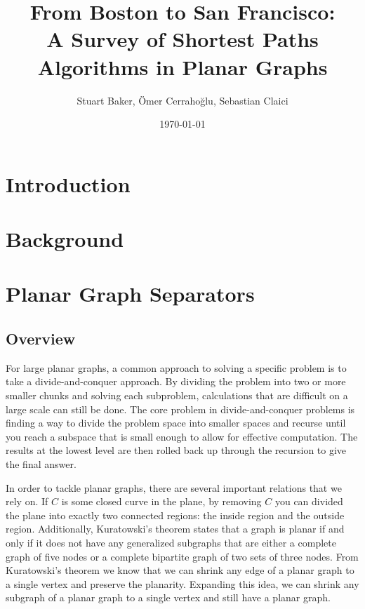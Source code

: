 \documentclass[12pt]{article}
\title{From Boston to San Francisco:\\ A Survey of Shortest Paths Algorithms in Planar Graphs}
\author{Stuart Baker, \"{O}mer Cerraho\u{g}lu, Sebastian Claici}
\date{\today}
\begin{document}
\maketitle

\begin{abstract}

\end{abstract}

\section{Introduction}
\label{sec:introduction}

\section{Background}
\label{sec:background}


\section{Planar Graph Separators}
\label{sec:graph-sep}

    \subsection{Overview}
    \label{sec:graph-sep-overview}


    For large planar graphs, a common approach to solving a specific problem is to take a divide-and-conquer approach. By dividing the problem into two or more smaller chunks and solving each subproblem, calculations that are difficult on a large scale can still be done. The core problem in divide-and-conquer problems is finding a way to divide the problem space into smaller spaces and recurse until you reach a subspace that is small enough to allow for effective computation. The results at the lowest level are then rolled back up through the recursion to give the final answer.

    In order to tackle planar graphs, there are several important relations that we rely on. If $C$ is some closed curve in the plane, by removing $C$ you can divided the plane into exactly two connected regions: the inside region and the outside region. Additionally, Kuratowski's theorem states that a graph is planar if and only if it does not have any generalized subgraphs that are either a complete graph of five nodes or a complete bipartite graph of two sets of three nodes. From Kuratowski's theorem we know that we can shrink any edge of a planar graph to a single vertex and preserve the planarity. Expanding this idea, we can shrink any subgraph of a planar graph to a single vertex and still have a planar graph.
\end{document}
